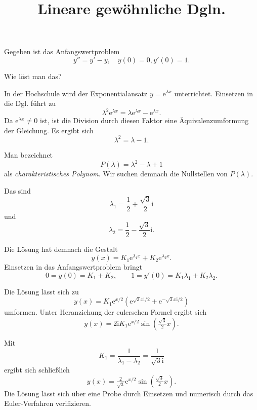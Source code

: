 \documentclass[9pt]{beamer}
\title{Lineare gewöhnliche Dgln.}
\date{}
\newcommand{\ee}{\mathrm e}
\newcommand{\ui}{\mathrm i}
\begin{document}
\maketitle

\begin{frame}
Gegeben ist das Anfangswertproblem
\[y'' = y'-y,\quad y(0)=0, y'(0)=1.\]
\end{frame}

\begin{frame}
Wie löst man das?
\end{frame}

\begin{frame}
In der Hochschule wird der Exponentialansatz $y=\ee^{\lambda x}$
unterrichtet. Einsetzen in die Dgl. führt zu
\[\lambda^2\ee^{\lambda x} = \lambda\ee^{\lambda x}-\ee^{\lambda x}.\]
Da $\ee^{\lambda x}\ne 0$ ist, ist die Division durch diesen Faktor
eine Äquivalenzumformung der Gleichung. Es ergibt sich
\[\lambda^2 = \lambda-1.\]
\end{frame}

\begin{frame}
Man bezeichnet
\[P(\lambda) = \lambda^2-\lambda+1\]
als \emph{charakteristisches Polynom}. Wir suchen demnach die
Nullstellen von $P(\lambda)$.
\end{frame}

\begin{frame}
Das sind
\[\lambda_1 = \frac{1}{2}+\frac{\sqrt{3}}{2}\ui\]
und
\[\lambda_2 = \frac{1}{2}-\frac{\sqrt{3}}{2}\ui.\]
\end{frame}

\begin{frame}
Die Lösung hat demnach die Gestalt
\[y(x) = K_1\ee^{\lambda_1 x}+K_2\ee^{\lambda_2 x}.\]
Einsetzen in das Anfangswertproblem bringt
\[0=y(0)=K_1+K_2,\qquad 1=y'(0)=K_1\lambda_1+K_2\lambda_2.\]
\end{frame}

\begin{frame}
Die Lösung lässt sich zu
\[y(x) = K_1\ee^{x/2}(\ee^{\sqrt{3}x\ui/2}+\ee^{-\sqrt{3}x\ui/2})\]
umformen. Unter Heranziehung der eulerschen Formel ergibt sich
\[y(x) = 2\ui K_1\ee^{x/2}\sin(\tfrac{\sqrt{3}}{2} x).\]
\end{frame}

\begin{frame}
Mit
\[K_1=\frac{1}{\lambda_1-\lambda_2} = \frac{1}{\sqrt{3}\ui}\]
ergibt sich schließlich
\[y(x) = \tfrac{2}{\sqrt{3}}\ee^{x/2}\sin(\tfrac{\sqrt{3}}{2} x).\]
Die Lösung lässt sich über eine Probe durch Einsetzen und numerisch
durch das Euler-Verfahren verifizieren.
\end{frame}
\end{document}
